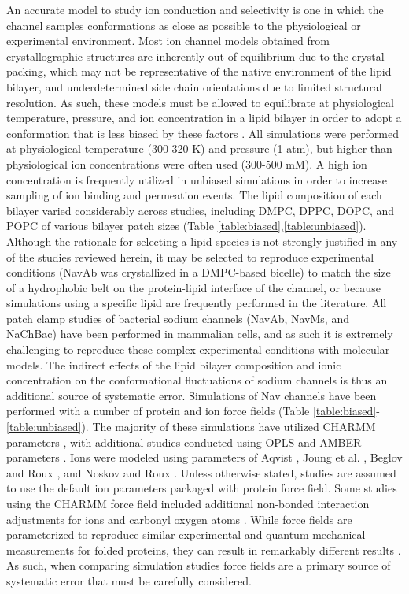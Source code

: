 \begin{refsection}
An accurate model to study ion conduction and selectivity is one in which the channel samples conformations as close as possible to the physiological or experimental environment.  Most ion channel models obtained from crystallographic structures are inherently out of equilibrium due to the crystal packing, which may not be representative of the native environment of the lipid bilayer, and underdetermined side chain orientations due to limited structural resolution.  As such, these models must be allowed to equilibrate at physiological temperature, pressure, and ion concentration in a lipid bilayer in order to adopt a conformation that is less biased by these factors \cite{Kandt:2007wz}.  All simulations were performed at physiological temperature (300-320 K) and pressure (1 atm), but higher than physiological ion concentrations were often used (300-500 mM).  A high ion concentration is frequently utilized in unbiased simulations in order to increase sampling of ion binding and permeation events.  The lipid composition of each bilayer varied considerably across studies, including DMPC, DPPC, DOPC, and POPC of various bilayer patch sizes (Table \ref{table:biased},\ref{table:unbiased}). Although the rationale for selecting a lipid species is not strongly justified in any of the studies reviewed herein, it may be selected to reproduce experimental conditions (NavAb was crystallized in a DMPC-based bicelle)\cite{Payandeh:2012ib} to match the size of a hydrophobic belt on the protein-lipid interface of the channel, or because simulations using a specific lipid are frequently performed in the literature. All patch clamp studies of bacterial sodium channels (NavAb, NavMs, and NaChBac) have been performed in mammalian cells, \cite{Payandeh:2012ib, Ulmschneider:2013da, FinolUrdaneta:2014bz} and as such it is extremely challenging to reproduce these complex experimental conditions with molecular models. The indirect effects of the lipid bilayer composition and ionic concentration on the conformational fluctuations of sodium channels is thus an additional source of systematic error.
Simulations of Nav channels have been performed with a number of protein and ion force fields (Table \ref{table:biased}-\ref{table:unbiased}). The majority of these simulations have utilized CHARMM parameters \cite{MacKerell:1998tp,MacKerellJr:2004dv}, with additional studies conducted using OPLS \cite{Jorgensen:1996vx,Kaminski:2001eq} and AMBER parameters \cite{Hornak:2006gx}.  Ions were modeled using parameters of Aqvist \cite{Aqvist:1990ud}, Joung et al. \cite{Joung:2008bp}, Beglov and Roux \cite{Beglov:1994ip}, and Noskov and Roux \cite{Noskov:2008jp}.  Unless otherwise stated, studies are assumed to use the default ion parameters packaged with protein force field.  Some studies using the CHARMM force field included additional non-bonded interaction adjustments for ions and carbonyl oxygen atoms \cite{Noskov:2004tv}.  While force fields are parameterized to reproduce similar experimental and quantum mechanical measurements for folded proteins, they can result in remarkably different results \cite{LindorffLarsen:2012gl,Rauscher:2015jn}.  As such, when comparing simulation studies force fields are a primary source of systematic error that must be carefully considered.

\end{refsection}
